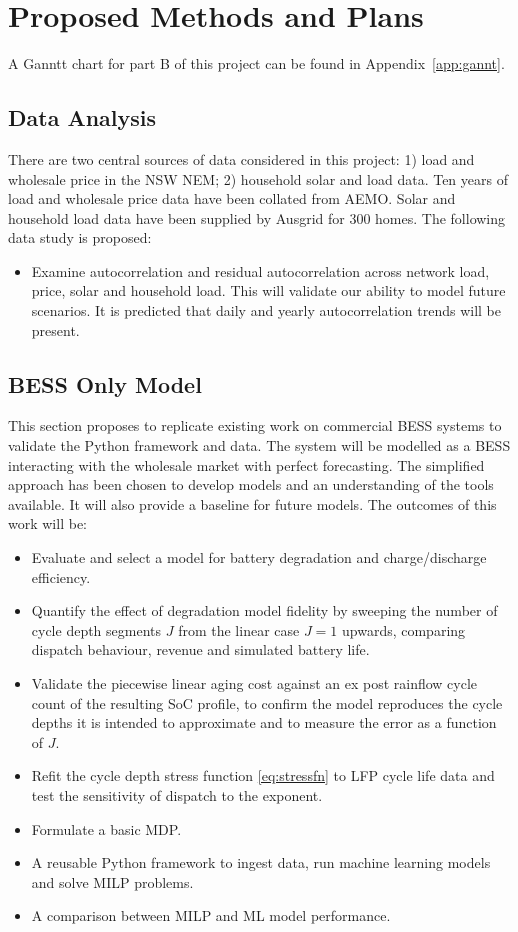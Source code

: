 \chapter{Proposed Methods and Plans}
A Ganntt chart for part B of this project can be found in Appendix~\ref{app:gannt}.

\section{Data Analysis}
There are two central sources of data considered in this project: 1) load and wholesale price in the NSW NEM; 2) household solar and load data. Ten years of load and wholesale price data have been collated from AEMO. Solar and household load data have been supplied by Ausgrid for 300 homes. The following data study is  proposed:

\begin{itemize}
    \item Examine autocorrelation and residual autocorrelation across network load, price, solar and household load. This will validate our ability to model future scenarios. It is predicted that daily and yearly autocorrelation trends will be present.
\end{itemize}

\section{BESS Only Model}
\label{sec:bess_only}
This section proposes to replicate existing work on commercial BESS systems to validate the Python framework and data. The system will be modelled as a BESS interacting with the wholesale market with perfect forecasting. The simplified approach has been chosen to develop models and an understanding of the tools available. It will also provide a baseline for future models. The outcomes of this work will be:

\begin{itemize}
    \item Evaluate and select a model for battery degradation and charge/discharge efficiency.
    \item Quantify the effect of degradation model fidelity by sweeping the number of cycle depth segments $J$ from the linear case $J=1$ upwards, comparing dispatch behaviour, revenue and simulated battery life.
    \item Validate the piecewise linear aging cost against an ex post rainflow cycle count of the resulting SoC profile, to confirm the model reproduces the cycle depths it is intended to approximate and to measure the error as a function of $J$.
    \item Refit the cycle depth stress function \eqref{eq:stressfn} to LFP cycle life data and test the sensitivity of dispatch to the exponent.
    \item Formulate a basic MDP.
    \item A reusable Python framework to ingest data, run machine learning models and solve MILP problems.
    \item A comparison between MILP and ML model performance.
\end{itemize}

